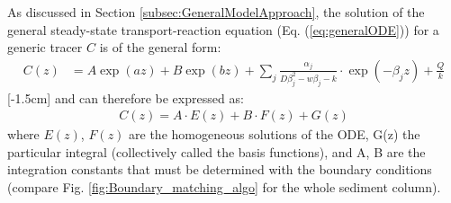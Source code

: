 \documentclass[gmd, manuscript]{copernicus}
\begin{document}
As discussed in Section \ref{subsec:GeneralModelApproach}, the solution of the general steady-state transport-reaction equation (Eq. (\ref{eq:generalODE})) for a generic tracer $C$ is of the general form:
\begin{align}
 C(z) &= A \exp(az) + B  \exp(bz) + \sum_j \frac{\alpha_j}{D \beta_j^2-w\beta_j-k}\cdot \exp(-\beta_j z) + \frac{Q}{k} \label{eq:ODE_general_solution}
\end{align}
[-1.5cm]%
and can therefore be expressed as:
\begin{align}
C(z) = A \cdot E(z) + B \cdot F(z) + G(z) 
\end{align}
where $E(z)$, $F (z)$ are the homogeneous solutions of the ODE, G(z) the particular integral (collectively called the basis functions), and A, B are the integration constants that must be determined with the boundary conditions 
(compare Fig. \ref{fig:Boundary_matching_algo} for the whole sediment column).
\end{document}
